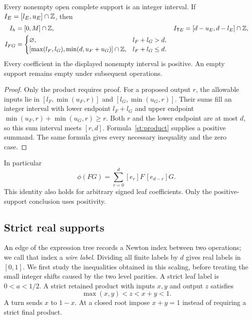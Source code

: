 \begin{proposition}\label{st:finite-support}
Every nonempty open complete support is an integer interval. If
$I_E=[l_E,u_E]\cap\mathbb Z$, then
\begin{align}
 I_h&=[0,M]\cap\mathbb Z,&
 I_{\mathsf T E}&=[d-u_E,d-l_E]\cap\mathbb Z,\notag\\
 I_{FG}&=
 \begin{cases}
 \varnothing,&l_F+l_G>d,\\
 [\max(l_F,l_G),\min(d,u_F+u_G)]\cap\mathbb Z,&l_F+l_G\le d.
 \end{cases}\label{st:interval}
\end{align}
Every coefficient in the displayed nonempty interval is positive.
An empty support remains empty under subsequent operations.
\end{proposition}
\begin{proof}
Only the product requires proof. For a proposed output $r$, the
allowable inputs lie in
$[l_F,\min(u_F,r)]$ and $[l_G,\min(u_G,r)]$.
Their sums fill an integer interval with lower endpoint $l_F+l_G$
and upper endpoint $\min(u_F,r)+\min(u_G,r)\ge r$.
Both $r$ and the lower endpoint are at most $d$, so this sum
interval meets $[r,d]$. Formula~\eqref{st:product} supplies a
positive summand. The same formula gives every necessary
inequality and the zero case.
\end{proof}
In particular
\[
 \phi(FG)=\sum_{r=0}^d [e_r]F\,[e_{d-r}]G.
\]
This identity also holds for arbitrary signed leaf coefficients.
Only the positive-support conclusion uses positivity.

\subsection{Strict real supports}
An edge of the expression tree records a Newton index between two
operations; we call that index a \emph{wire label}. Dividing all
finite labels by $d$ gives real labels in $[0,1]$. We first study the
inequalities obtained in this scaling, before treating the small
integer shifts caused by the two level parities. A strict leaf label is
$0<a<1/2$. A strict retained product with inputs $x,y$ and output
$z$ satisfies
\begin{equation}\label{st:strict-gate}
 \max(x,y)<z<x+y<1.
\end{equation}
A turn sends $x$ to $1-x$. At a closed root impose $x+y=1$
instead of requiring a strict final product.

